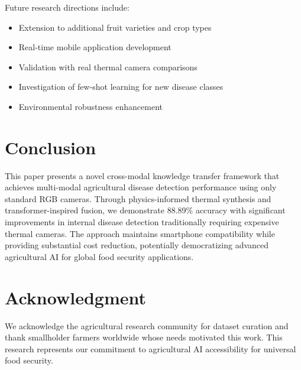 \documentclass[conference]{IEEEtran}
\begin{document}
Future research directions include:
\begin{itemize}
    \item Extension to additional fruit varieties and crop types
    \item Real-time mobile application development
    \item Validation with real thermal camera comparisons
    \item Investigation of few-shot learning for new disease classes
    \item Environmental robustness enhancement
\end{itemize}

\section{Conclusion}

This paper presents a novel cross-modal knowledge transfer framework that achieves multi-modal agricultural disease detection performance using only standard RGB cameras. Through physics-informed thermal synthesis and transformer-inspired fusion, we demonstrate 88.89\% accuracy with significant improvements in internal disease detection traditionally requiring expensive thermal cameras. The approach maintains smartphone compatibility while providing substantial cost reduction, potentially democratizing advanced agricultural AI for global food security applications.

\section*{Acknowledgment}

We acknowledge the agricultural research community for dataset curation and thank smallholder farmers worldwide whose needs motivated this work. This research represents our commitment to agricultural AI accessibility for universal food security.
\end{document}
